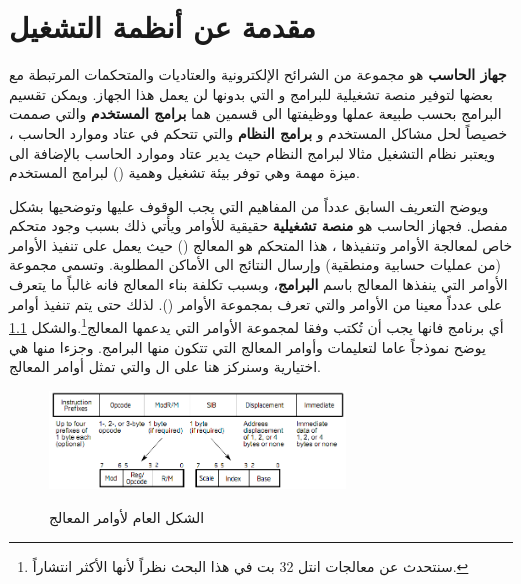 \documentclass[document.tex]{subfiles}
\begin{document}
\chapter{مقدمة عن أنظمة التشغيل}
\textbf{جهاز الحاسب} هو مجموعة من الشرائح الإلكترونية والعتاديات والمتحكمات المرتبطة مع بعضها لتوفير منصة تشغيلية للبرامج و التي بدونها لن يعمل هذا الجهاز. ويمكن تقسيم البرامج بحسب طبيعة عملها ووظيفتها الى قسمين هما \textbf{برامج المستخدم} والتي صممت خصيصاً لحل مشاكل المستخدم و \textbf{برامج النظام} والتي تتحكم في عتاد وموارد الحاسب ، ويعتبر نظام التشغيل مثالا لبرامج النظام حيث يدير عتاد وموارد الحاسب بالإضافة الى ميزة مهمة وهي توفر بيئة تشغيل وهمية () لبرامج المستخدم.  

ويوضح التعريف السابق عدداً من المفاهيم التي يجب الوقوف عليها وتوضحيها بشكل مفصل. فجهاز الحاسب هو \textbf{منصة تشغيلية} حقيقية للأوامر ويأتي ذلك بسبب وجود متحكم خاص لمعالجة الأوامر وتنفيذها ، هذا المتحكم هو المعالج () حيث يعمل على تنفيذ الأوامر (من عمليات حسابية ومنطقية) وإرسال النتائج الى الأماكن المطلوبة. وتسمى مجموعة الأوامر التي ينفذها المعالج باسم \textbf{البرامج}، وبسبب تكلفة بناء المعالج فانه غالباً ما يتعرف على عدداً معينا من الأوامر والتي تعرف بمجموعة الأوامر (). لذلك حتى يتم تنفيذ أوامر أي برنامج فانها يجب أن تُكتب وفقا لمجموعة الأوامر التي يدعمها المعالج\footnote{سنتحدث عن معالجات انتل 32 بت في هذا البحث نظراً لأنها الأكثر انتشاراً.}.والشكل  \ref{fig:instruction_format} يوضح نموذجاً عاما لتعليمات وأوامر المعالج التي تتكون منها البرامج. وجزءا منها هي اختيارية وسنركز هنا على ال  والتي تمثل أوامر المعالج. 

\begin{figure}[h!] 
  \caption{الشكل العام لأوامر المعالج }
  \centering
   \includegraphics[width=0.7\textwidth]{../img/instruction_format}
 \label{fig:instruction_format} 
\end{figure}
 
\end{document}
